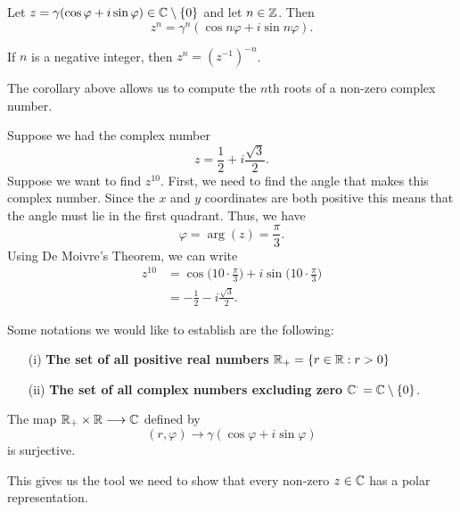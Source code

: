 \documentclass[a4paper]{report}
\begin{document}
\begin{corollary}
   Let \( z = \gamma (\cos \varphi + i \sin \varphi) \in \mathbb{C} \setminus  \{ 0 \}  \) and let \( n \in \mathbb{Z}   \). Then
   \[  z^{n} = \gamma^{n} (\cos n \varphi + i \sin n \varphi). \]
\end{corollary}

\begin{remark}
 If \( n  \) is a negative integer, then \( z^{n} = (z^{-1})^{-n} \). 
\end{remark}

The corollary above allows us to compute the \( n \)th roots of a non-zero complex number.

\begin{eg}
   Suppose we had the complex number  
   \[  z = \frac{ 1 }{ 2 }  + i \frac{ \sqrt{ 3 }  }{ 2 }. \]
  Suppose we want to find \( z^{10} \). First, we need to find the angle that makes this complex number. Since the \( x  \) and \( y  \) coordinates are both positive this means that the angle must lie in the first quadrant. Thus, we have 
  \[  \varphi = \arg(z) = \frac{ \pi }{ 3  }. \]
  Using De Moivre's Theorem, we can write
  \begin{align*}
      z^{10 } &= \cos \Big(  10 \cdot \frac{ \pi  }{ 3 }  \Big) + i \sin \Big(  10 \cdot \frac{ \pi }{ 3 }  \Big) \\
              &= -\frac{1 }{ 2 }  - i \frac{ \sqrt{ 3 }  }{ 2 }. 
  \end{align*}
\end{eg}

Some notations we would like to establish are the following:
\begin{enumerate}
    \item[(i)] \textbf{The set of all positive real numbers} \( {\mathbb{R}}_{+} = \{ r \in \mathbb{R} : r > 0  \}  \)
    \item[(ii)] \textbf{The set of all complex numbers excluding zero} \( \mathbb{C}^{\cdot} =  \mathbb{C} \setminus \{ 0 \}  \).
\end{enumerate}

\begin{prop}
    The map \( {\mathbb{R}}_{+} \times \mathbb{R} \longrightarrow \mathbb{C}^{} \) defined by 
    \[  (r, \varphi) \longrightarrow \gamma ( \cos \varphi + i \sin \varphi) \]
    is surjective.
\end{prop}

\begin{remark}
    This gives us the tool we need to show that every non-zero \( z \in \mathbb{C}  \) has a polar representation.
\end{remark}
\end{document}
